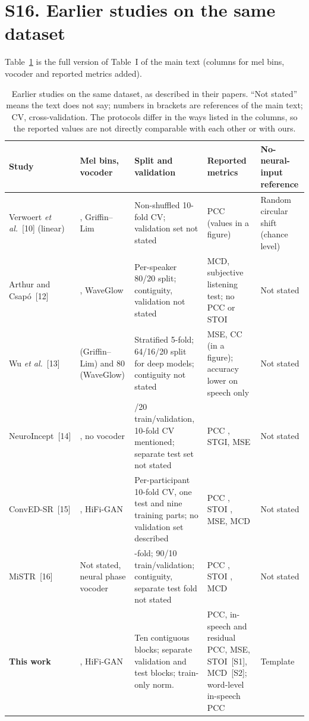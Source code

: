 \documentclass[10pt,a4paper]{article}
\begin{document}
\section*{S16. Earlier studies on the same dataset}

Table~\ref{tab:s_prior} is the full version of Table~I of the main text (columns for mel bins, vocoder and reported metrics added).

\begin{table}[H]
\caption{Earlier studies on the same dataset, as described in their papers. ``Not stated'' means the text does not say; numbers in brackets are references of the main text; CV, cross-validation. The protocols differ in the ways listed in the columns, so the reported values are not directly comparable with each other or with ours.}
\label{tab:s_prior}
\centering\scriptsize
\setlength{\tabcolsep}{3pt}
\renewcommand{\arraystretch}{1.1}
\begin{tabular}{@{}>{\raggedright\arraybackslash}p{2.2cm}>{\raggedright\arraybackslash}p{2.4cm}>{\raggedright\arraybackslash}p{4.4cm}>{\raggedright\arraybackslash}p{3.2cm}>{\raggedright\arraybackslash}p{2.4cm}@{}}
\hline
Study & Mel bins, vocoder & Split and validation & Reported metrics & No-neural-input reference \\
\hline
Verwoert \emph{et al.}~[10] (linear) & 23, Griffin--Lim & Non-shuffled 10-fold CV; validation set not stated & PCC (values in a figure) & Random circular shift (chance level) \\
Arthur and Csap\'o~[12] & 80, WaveGlow & Per-speaker 80/20 split; contiguity, validation not stated & MCD, subjective listening test; no PCC or STOI & Not stated \\
Wu \emph{et al.}~[13] & 23 (Griffin--Lim) and 80 (WaveGlow) & Stratified 5-fold; 64/16/20 split for deep models; contiguity not stated & MSE, CC (in a figure); accuracy lower on speech only & Not stated \\
NeuroIncept~[14] & 128, no vocoder & 80/20 train/validation, 10-fold CV mentioned; separate test set not stated & PCC \NXPubNeuPcc{}, STGI, MSE & Not stated \\
ConvED-SR~[15] & 80, HiFi-GAN & Per-participant 10-fold CV, one test and nine training parts; no validation set described & PCC \NXPubConvedsrPcc{}, STOI \NXPubConvedsrStoi{}, MSE, MCD & Not stated \\
MiSTR~[16] & Not stated, neural phase vocoder & 10-fold; 90/10 train/validation; contiguity, separate test fold not stated & PCC \NXPubMistrPcc{}, STOI \NXPubMistrStoi{}, MCD & Not stated \\
\hline
\textbf{This work} & 80, HiFi-GAN & Ten contiguous blocks; separate validation and test blocks; train-only norm. & PCC, in-speech and residual PCC, MSE, STOI~[S1], MCD~[S2]; word-level in-speech PCC & Template \\
\hline
\end{tabular}
\end{table}
\end{document}
